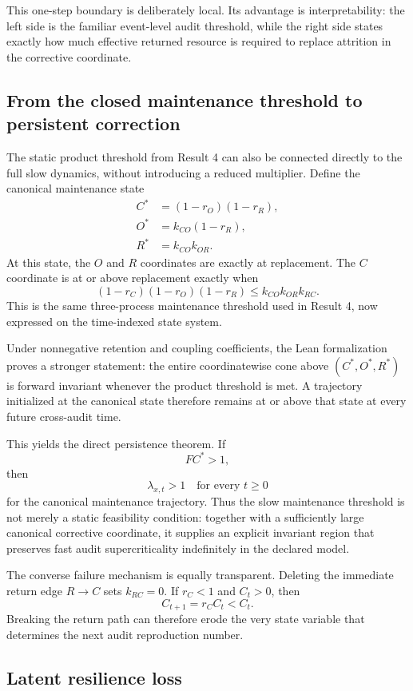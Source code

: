 This one-step boundary is deliberately local. Its advantage is interpretability: the left side is the familiar event-level audit threshold, while the right side states exactly how much effective returned resource is required to replace attrition in the corrective coordinate.

\subsection{From the closed maintenance threshold to persistent correction}

The static product threshold from Result 4 can also be connected directly to the full slow dynamics, without introducing a reduced multiplier. Define the canonical maintenance state
\begin{align}
C^*&=(1-r_O)(1-r_R),\\
O^*&=k_{CO}(1-r_R),\\
R^*&=k_{CO}k_{OR}.
\end{align}
At this state, the $O$ and $R$ coordinates are exactly at replacement. The $C$ coordinate is at or above replacement exactly when
\[
\boxed{
(1-r_C)(1-r_O)(1-r_R)
\le
k_{CO}k_{OR}k_{RC}.
}
\]
This is the same three-process maintenance threshold used in Result 4, now expressed on the time-indexed state system.

Under nonnegative retention and coupling coefficients, the Lean formalization proves a stronger statement: the entire coordinatewise cone above $(C^*,O^*,R^*)$ is forward invariant whenever the product threshold is met. A trajectory initialized at the canonical state therefore remains at or above that state at every future cross-audit time.

This yields the direct persistence theorem. If
\[
F C^*>1,
\]
then
\[
\boxed{
\lambda_{x,t}>1\quad\text{for every }t\ge0
}
\]
for the canonical maintenance trajectory. Thus the slow maintenance threshold is not merely a static feasibility condition: together with a sufficiently large canonical corrective coordinate, it supplies an explicit invariant region that preserves fast audit supercriticality indefinitely in the declared model.

The converse failure mechanism is equally transparent. Deleting the immediate return edge $R\to C$ sets $k_{RC}=0$. If $r_C<1$ and $C_t>0$, then
\[
C_{t+1}=r_C C_t<C_t.
\]
Breaking the return path can therefore erode the very state variable that determines the next audit reproduction number.

\subsection{Latent resilience loss}

